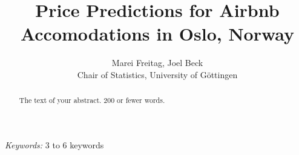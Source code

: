 \begin{titlepage}

\title{\bf Price Predictions for Airbnb Accomodations in Oslo, Norway}

\author{Marei Freitag, Joel Beck \hspace{.2cm}\\ Chair of Statistics, University of G\"ottingen\\}

\maketitle

\bigskip

\begin{abstract}
    The text of your abstract.  200 or fewer words.
\end{abstract}

\noindent%
    {\it Keywords:}  3 to 6 keywords
\vfill

\end{titlepage}
